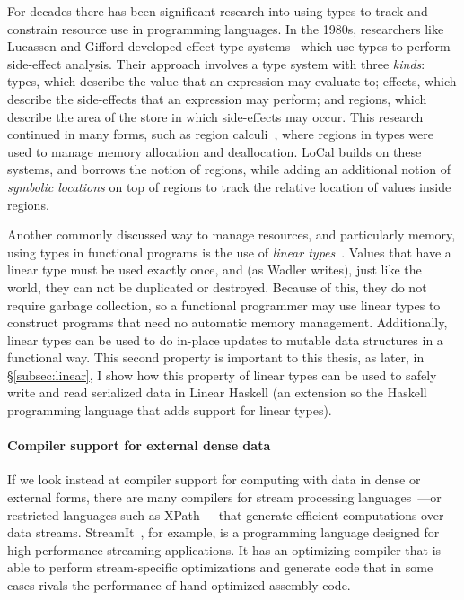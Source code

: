 \documentclass[showabstract,showacknowledgments,showpreface,showdedication,school]{iuphd}
\theoremstyle{nonumberplain}
\newcommand{\sysname}[0]{LoCal\xspace}
\newcommand{\ourcalc}[0]{\sysname}
\newcommand{\secref}[1]{\S\ref{#1}}
\begin{document}
For decades there has been significant research into using types to track and
constrain resource use in programming languages. In the 1980s, researchers like
Lucassen and Gifford developed effect type systems~\cite{effect-types} which use
types to perform side-effect analysis. Their approach involves a type system
with three \emph{kinds}: types, which describe the value that an expression may
evaluate to; effects, which describe the side-effects that an expression may
perform; and regions, which describe the area of the store in which side-effects
may occur.
This research continued in many forms, such as region
calculi~\cite{mlkit-retrospective, regioncalcs, cyclone-pldi}, where regions in
types were used to manage memory allocation and deallocation. \ourcalc{}
builds on these systems, and borrows the notion of regions, while adding
an additional notion of \emph{symbolic locations} on top of regions to
track the relative location of values inside regions.

Another commonly discussed way to manage resources, and particularly memory,
using types in functional programs is the use of \emph{linear
types}~\cite{wadler-linear-types}. Values that have a linear type must be used
exactly once, and (as Wadler writes), just like the world, they can not be
duplicated or destroyed. Because of this, they do not require garbage
collection, so a functional programmer may use linear types to construct
programs that need no automatic memory management. Additionally, linear types
can be used to do in-place updates to mutable data structures in a functional
way. This second property is important to this thesis, as later, in
\secref{subsec:linear}, I show how this property of linear types can be used to
safely write and read serialized data in Linear Haskell (an extension so the Haskell
programming language that adds support for linear types).


\paragraph{Compiler support for external dense data}

If we look instead at compiler support for computing with data in dense or
external forms, there are many compilers for stream processing
languages~\cite{streamit,wavescript-nsdi}---or restricted languages such as
XPath~\cite{xpath-streams}---that generate efficient computations over data
streams.
StreamIt~\cite{streamit}, for example, is a programming language designed for
high-performance streaming applications. It has an optimizing compiler that is
able to perform stream-specific optimizations and generate code that in some
cases rivals the performance of hand-optimized assembly code.
\end{document}
